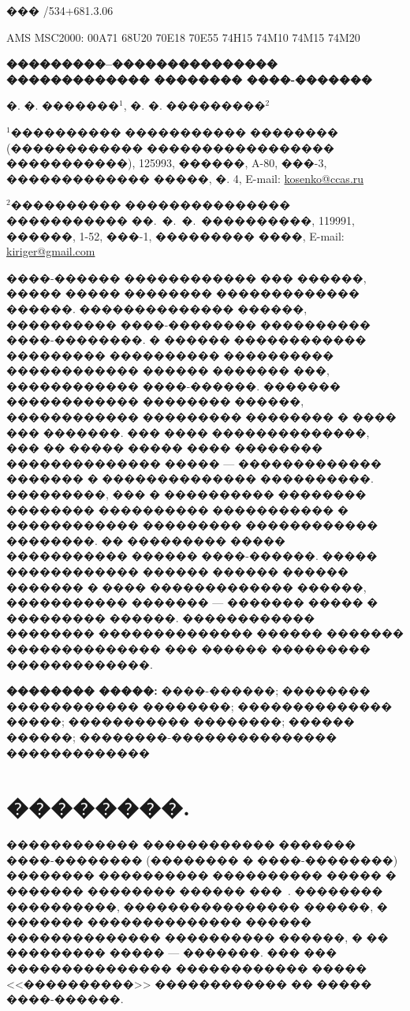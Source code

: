 \documentclass[12pt,a4paper]{article}
\newcommand{\class}[1]{\noindent ��� \medskip #1\par\smallskip }
\renewcommand{\abstract}[1]{\smallskip #1\par\smallskip }
\renewcommand{\title}[1]{\begin{center}{\bf #1}\end{center}}
\renewcommand{\author}[1]{\centerline{#1}}
\newcommand{\MSCindex}[1]{\noindent AMS MSC2000: \smallskip #1\par\smallskip }
\newcommand{\keywordsrus}[1]{{\bf �������� �����:}\smallskip #1\par\smallskip }
\begin{document}
\large

\class{531/534+681.3.06}
\MSCindex{00A71 68U20 70E18 70E55 74H15 74M10 74M15 74M20}
  
\title{���������--��������������� ������������� �������� ����-�������}

\author{�. �. �������${}^1$, �. �. ���������${}^2$}
\begin{center}
\normalsize
${}^1$���������� ����������� �������� (������������ ����������������� 
�����������),
125993, ������, A-80, ���-3, ������������� �����, �. 4,
E-mail: \url{kosenko@ccas.ru}

${}^2$���������� ��������������� ����������� ��.~�.~�.~����������,
119991, ������, 1-52, ���-1, ��������� ����,
E-mail: \url{kiriger@gmail.com}
\large
\end{center}  

\smallskip
         
\normalsize
\abstract
{
����-������ ������������ ��� ������, ����� ����� �������� ������������� ������.
�������������� ������, ���������� ����-�������� ���������� ����-��������. � 
������ ������������ ��������� ���������� ���������� ������������ ������ �������
���, ������������ ����-������. ������� ������������ �������� ������, 
������������ ��������� �������� � ���� ��� �������. ��� ���� ��������������, 
��� �� ����� ����� ���� �������� �������������� ����� --- ������������� ������� 
� �������������� ����������. ���������, ��� � ���������� �������� �������� 
���������� ����������� � ������������ ��������� ������������ ��������. �� 
��������� ����� ����������� ������ ����-������. ����� ������������ ������ 
������ ������ ������� � ���� ������������� ������, ����������� ������� --- 
������� ����� � ��������� ������. ������������ �������� �������������� ������
������� �������������� ��� ������ ��������� �������������.
}

\keywordsrus
{
����-������; �������� ������������ ��������; �������������� �����; �����������
��������; ������ ������; ��������-��������������� �������������
}

\large

\bigskip

\section{��������.\ }
\label{sec1}
������������ ������������ ������� ����-�������� (�������� � ����-��������)
�������� ���������� ���������� ����� � ������� �������� ������ 
���~\cite{CampionBastinAndreaNovel,BorisovKilinMamaev,Kalman,Tobolar,
ZobovaTatarinov}. �������� ����������, ���������������� ������, � ������� 
�������������� ������ �������������� ���������� ������, � �� ��������� ����� 
--- �������. ��� ��� ��������������� ������������ ����� <<����������>> 
������������ �� ����� ����-������.
\end{document}
